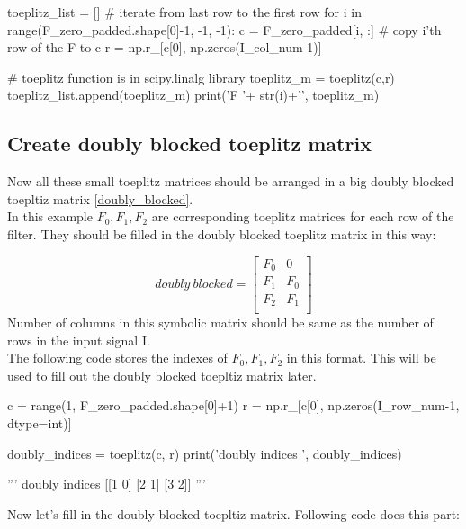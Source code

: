 \documentclass[11pt]{article}
\begin{document}
	\vspace{10mm}
	\begin{python}
	toeplitz_list = []
	# iterate from last row to the first row
	for i in range(F_zero_padded.shape[0]-1, -1, -1):
	 c = F_zero_padded[i, :] # copy i'th row of the F to c
	 r = np.r_[c[0], np.zeros(I_col_num-1)]
	 
	 # toeplitz function is in scipy.linalg library
	 toeplitz_m = toeplitz(c,r) 
	 toeplitz_list.append(toeplitz_m)
	 print('F '+ str(i)+'\n', toeplitz_m)
	\end{python}
	\vspace{10mm}
	
	\subsection{Create doubly blocked toeplitz matrix}
	Now all these small toeplitz matrices should be arranged in a big doubly blocked toepltiz matrix \ref{doubly_blocked}.\\
	In this example $F_0, F_1, F_2$ are corresponding toeplitz matrices for each row of the filter. They should be filled in the doubly blocked toeplitz matrix in this way:
	
	\begin{equation}
	doubly \ blocked = 
	\begin{bmatrix}
	F_0 & 0 \\
	F_1 & F_0 \\
	F_2 & F_1 \\
	\end{bmatrix}
	\end{equation}
	Number of columns in this symbolic matrix should be same as the number of rows in the input signal I.\\
	The following code stores the indexes of $F_0, F_1, F_2$ in this format. This will be used to fill out the doubly blocked toepltiz matrix later.
	
	\vspace{10mm}
	\begin{python}
	c = range(1, F_zero_padded.shape[0]+1)
	r = np.r_[c[0], np.zeros(I_row_num-1, dtype=int)]
	
	doubly_indices = toeplitz(c, r)
	print('doubly indices \n', doubly_indices)
	
	'''
	doubly indices 
	[[1 0]
	[2 1]
	[3 2]]
	'''
	\end{python}

	Now let's fill in the doubly blocked toepltiz matrix. Following code does this part:
	
\end{document}
